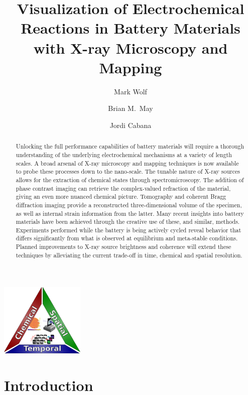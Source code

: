 \documentclass[journal=cmatex,manuscript=perspective]{achemso}
\author{Mark Wolf}
\author{Brian M.\ May}
\author{Jordi Cabana}
\affiliation[University of Illinois at Chicago]
{Department of Chemistry, University of Illinois at Chicago, Chicago IL}
\title{Visualization of Electrochemical Reactions in Battery Materials
  with X-ray Microscopy and Mapping}
\begin{document}
\begin{tocentry}
  \includegraphics[height=1.375in]{resolution-triangle.png}
\end{tocentry}

\begin{abstract}
  Unlocking the full performance capabilities of battery materials
  will require a thorough understanding of the underlying
  electrochemical mechanisms at a variety of length scales. A broad
  arsenal of X-ray microscopy and mapping techniques is now available
  to probe these processes down to the nano-scale. The tunable nature
  of X-ray sources allows for the extraction of chemical states
  through spectromicroscopy. The addition of phase contrast imaging
  can retrieve the complex-valued refraction of the material, giving
  an even more nuanced chemical picture. Tomography and coherent Bragg
  diffraction imaging provide a reconstructed three-dimensional volume
  of the specimen, as well as internal strain information from the
  latter. Many recent insights into battery materials have been
  achieved through the creative use of these, and similar,
  methods. Experiments performed while the battery is being actively
  cycled reveal behavior that differs significantly from what is
  observed at equilibrium and meta-stable conditions. Planned
  improvements to X-ray source brightness and coherence will extend
  these techniques by alleviating the current trade-off in time,
  chemical and spatial resolution.
\end{abstract}

\section{Introduction}
\end{document}

